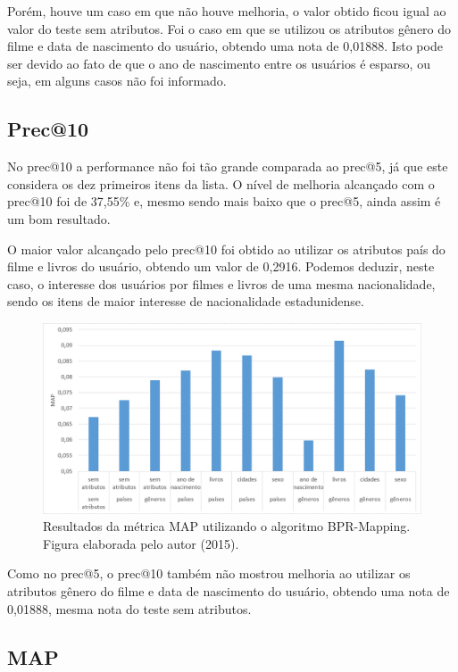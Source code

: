 Porém, houve um caso em que não houve melhoria, o valor obtido ficou igual ao valor do teste sem atributos. Foi o caso em que se utilizou os atributos gênero do filme e data de nascimento do usuário, obtendo uma nota de 0,01888. Isto pode ser devido ao fato de que o ano de nascimento entre os usuários é esparso, ou seja, em alguns casos não foi informado.



\subsection{Prec@10}

No prec@10 a performance não foi tão grande comparada ao prec@5, já que este considera os dez primeiros itens da lista. O nível de melhoria alcançado com o prec@10 foi de 37,55\% e, mesmo sendo mais baixo que o prec@5, ainda assim é um bom resultado.

O maior valor alcançado pelo prec@10 foi obtido ao utilizar os atributos país do filme e livros do usuário, obtendo um valor de 0,2916. Podemos deduzir, neste caso, o interesse dos usuários por filmes e livros de uma mesma nacionalidade, sendo os itens de maior interesse de nacionalidade estadunidense.


\begin{figure}
	\centering
	\includegraphics[scale=0.55]{imagens/grafico_map.png}
	\caption{Resultados da métrica MAP utilizando o algoritmo BPR-Mapping. Figura elaborada pelo autor (2015).}
	\label{fig:grafico_map}
\end{figure}

Como no prec@5, o prec@10 também não mostrou melhoria ao utilizar os atributos gênero do filme e data de nascimento do usuário, obtendo uma nota de 0,01888, mesma nota do teste sem atributos.


\subsection{MAP}

